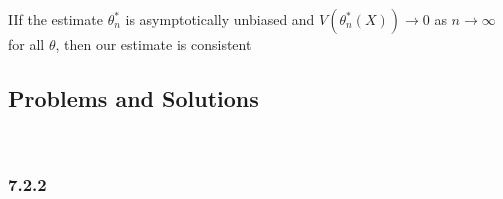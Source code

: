 \par\bigskip
\begin{theo}
  IIf the estimate $\theta_n^*$ is asymptotically unbiased and $V(\theta_n^*(X))\to0$ as $n\to\infty$ for all $\theta$, then our estimate is consistent
\end{theo}
\par\bigskip

\par\bigskip
\subsection{Problems and Solutions}\hfill\\\par
\subsubsection{7.2.2}\hfill\\
